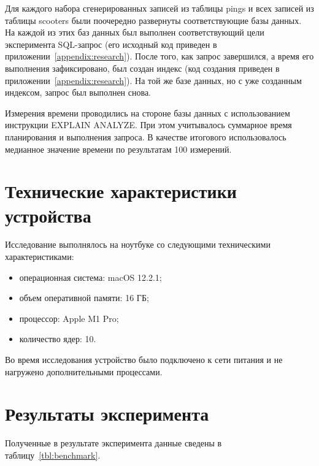 Для каждого набора сгенерированных записей из таблицы pings и всех записей из таблицы scooters были поочередно развернуты соответствующие базы данных. На каждой из этих баз данных был выполнен соответствующий цели эксперимента SQL-запрос (его исходный код приведен в приложении~\ref{appendix:research}). После того, как запрос завершился, а время его выполнения зафиксировано, был создан индекс (код создания приведен в приложении~\ref{appendix:research}). На той же базе данных, но с уже созданным индексом, запрос был выполнен снова.

Измерения времени проводились на стороне базы данных с использованием инструкции EXPLAIN ANALYZE. При этом учитывалось суммарное время планирования и выполнения запроса. В качестве итогового использовалось медианное значение времени по результатам 100 измерений.

\section{Технические характеристики устройства}

Исследование выполнялось на ноутбуке со следующими техническими характеристиками:

\begin{itemize}
    \item операционная система: macOS 12.2.1;
    \item объем оперативной памяти: 16 ГБ;
    \item процессор: Apple M1 Pro;
    \item количество ядер: 10.
\end{itemize}

Во время исследования устройство было подключено к сети питания и не нагружено дополнительными процессами.

\pagebreak
\section{Результаты эксперимента}

Полученные в результате эксперимента данные сведены в таблицу~\ref{tbl:benchmark}.

